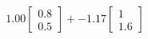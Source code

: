 \documentclass[preview]{standalone}
\begin{document}
\begin{align*}
1.00 \begin{bmatrix} 0.8 \\ 0.5 \end{bmatrix} + -1.17 \begin{bmatrix} 1 \\ 1.6 \end{bmatrix}
\end{align*}
\end{document}
